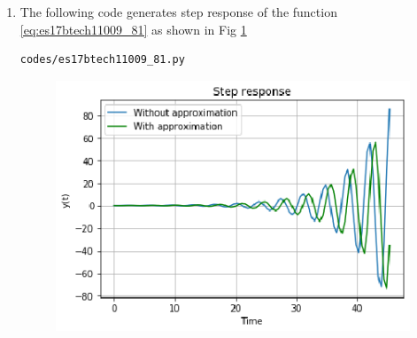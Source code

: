 \begin{enumerate}[label=\thesection.\arabic*.,ref=\thesection.\theenumi]
 \item
The following code generates step response of the function \eqref{eq:es17btech11009_81} as shown in Fig \ref{fig:es17btech11009_fig81}
\begin{lstlisting}
codes/es17btech11009_81.py
\end{lstlisting}
\begin{figure}[!h]
\centering
\includegraphics[width=\columnwidth]{./figs/es17btech11009_81.eps}
\caption{}
\label{fig:es17btech11009_fig81}
\end{figure}
  

\end{enumerate}
